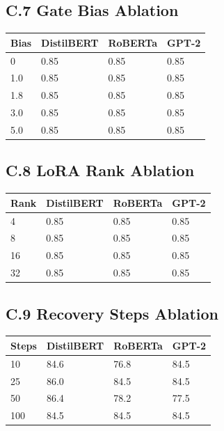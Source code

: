 \subsection{C.7 Gate Bias Ablation}

\begin{table}[H]
\centering
\small
\begin{tabular}{llll}
\toprule
\textbf{Bias} & \textbf{DistilBERT} & \textbf{RoBERTa} & \textbf{GPT-2} \\
\midrule
0 & 0.85 & 0.85 & 0.85 \\
1.0 & 0.85 & 0.85 & 0.85 \\
1.8 & 0.85 & 0.85 & 0.85 \\
3.0 & 0.85 & 0.85 & 0.85 \\
5.0 & 0.85 & 0.85 & 0.85 \\
\bottomrule
\end{tabular}
\end{table}

\subsection{C.8 LoRA Rank Ablation}

\begin{table}[H]
\centering
\small
\begin{tabular}{llll}
\toprule
\textbf{Rank} & \textbf{DistilBERT} & \textbf{RoBERTa} & \textbf{GPT-2} \\
\midrule
4 & 0.85 & 0.85 & 0.85 \\
8 & 0.85 & 0.85 & 0.85 \\
16 & 0.85 & 0.85 & 0.85 \\
32 & 0.85 & 0.85 & 0.85 \\
\bottomrule
\end{tabular}
\end{table}

\subsection{C.9 Recovery Steps Ablation}

\begin{table}[H]
\centering
\small
\begin{tabular}{llll}
\toprule
\textbf{Steps} & \textbf{DistilBERT} & \textbf{RoBERTa} & \textbf{GPT-2} \\
\midrule
10 & 84.6 & 76.8 & 84.5 \\
25 & 86.0 & 84.5 & 84.5 \\
50 & 86.4 & 78.2 & 77.5 \\
100 & 84.5 & 84.5 & 84.5 \\
\bottomrule
\end{tabular}
\end{table}

